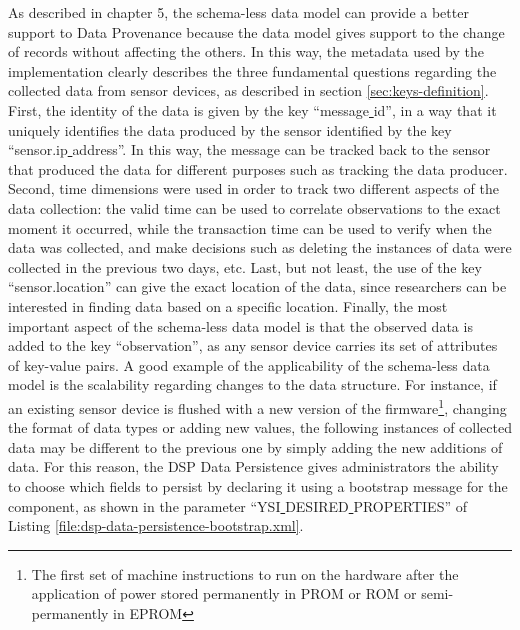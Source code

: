 As described in chapter 5, the schema-less data model can provide a better
support to Data Provenance because the data model gives support to the change
of records without affecting the others. In this way, the metadata used by the
implementation clearly describes the three fundamental questions regarding the
collected data from sensor devices, as described in section
\ref{sec:keys-definition}. First, the identity of the data is given by the key
``message\underline{ }id'', in a way that it uniquely identifies the data
produced by the sensor identified by the key ``sensor.ip\underline{
}address''. In this way, the message can be tracked back to the sensor that
produced the data for different purposes such as tracking the data producer.
Second, time dimensions were used in order to track two different aspects of
the data collection: the valid time can be used to correlate observations to
the exact moment it occurred, while the transaction time can be used to verify
when the data was collected, and make decisions such as deleting the instances
of data were collected in the previous two days, etc. Last, but not least, the
use of the key ``sensor.location'' can give the exact location of the data,
since researchers can be interested in finding data based on a specific
location. Finally, the most important aspect of the schema-less data model is
that the observed data is added to the key ``observation'', as any sensor
device carries its set of attributes of key-value pairs. A good example of the
applicability of the schema-less data model is the scalability regarding
changes to the data structure. For instance, if an existing sensor device is
flushed with a new version of the firmware\footnote{The first set of machine
instructions to run on the hardware after the application of power stored
permanently in PROM or ROM or semi-permanently in EPROM}, changing the format
of data types or adding new values, the following instances of collected data
may be different to the previous one by simply adding the new additions of
data. For this reason, the DSP Data Persistence gives administrators the
ability to choose which fields to persist by declaring it using a bootstrap
message for the component, as shown in the parameter ``YSI\underline{
}DESIRED\underline{ }PROPERTIES'' of Listing
\ref{file:dsp-data-persistence-bootstrap.xml}.


